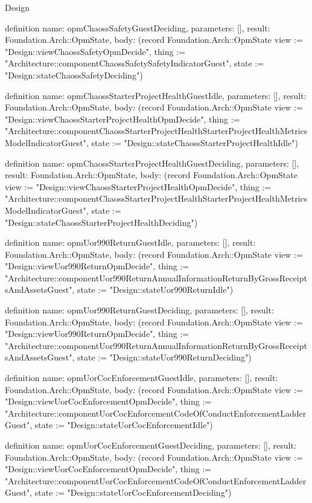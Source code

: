 \begin{lexlean}{Design}
\begin{semanticmodule}
definition{
  name: opmChaossSafetyGuestDeciding,
  parameters: [],
  result: Foundation.Arch::OpmState,
  body: (record Foundation.Arch::OpmState {view := "Design::viewChaossSafetyOpmDecide", thing := "Architecture::componentChaossSafetySafetyIndicatorGuest", state := "Design::stateChaossSafetyDeciding"})
}

definition{
  name: opmChaossStarterProjectHealthGuestIdle,
  parameters: [],
  result: Foundation.Arch::OpmState,
  body: (record Foundation.Arch::OpmState {view := "Design::viewChaossStarterProjectHealthOpmDecide", thing := "Architecture::componentChaossStarterProjectHealthStarterProjectHealthMetricsModelIndicatorGuest", state := "Design::stateChaossStarterProjectHealthIdle"})
}

definition{
  name: opmChaossStarterProjectHealthGuestDeciding,
  parameters: [],
  result: Foundation.Arch::OpmState,
  body: (record Foundation.Arch::OpmState {view := "Design::viewChaossStarterProjectHealthOpmDecide", thing := "Architecture::componentChaossStarterProjectHealthStarterProjectHealthMetricsModelIndicatorGuest", state := "Design::stateChaossStarterProjectHealthDeciding"})
}

definition{
  name: opmUor990ReturnGuestIdle,
  parameters: [],
  result: Foundation.Arch::OpmState,
  body: (record Foundation.Arch::OpmState {view := "Design::viewUor990ReturnOpmDecide", thing := "Architecture::componentUor990ReturnAnnualInformationReturnByGrossReceiptsAndAssetsGuest", state := "Design::stateUor990ReturnIdle"})
}

definition{
  name: opmUor990ReturnGuestDeciding,
  parameters: [],
  result: Foundation.Arch::OpmState,
  body: (record Foundation.Arch::OpmState {view := "Design::viewUor990ReturnOpmDecide", thing := "Architecture::componentUor990ReturnAnnualInformationReturnByGrossReceiptsAndAssetsGuest", state := "Design::stateUor990ReturnDeciding"})
}

definition{
  name: opmUorCocEnforcementGuestIdle,
  parameters: [],
  result: Foundation.Arch::OpmState,
  body: (record Foundation.Arch::OpmState {view := "Design::viewUorCocEnforcementOpmDecide", thing := "Architecture::componentUorCocEnforcementCodeOfConductEnforcementLadderGuest", state := "Design::stateUorCocEnforcementIdle"})
}

definition{
  name: opmUorCocEnforcementGuestDeciding,
  parameters: [],
  result: Foundation.Arch::OpmState,
  body: (record Foundation.Arch::OpmState {view := "Design::viewUorCocEnforcementOpmDecide", thing := "Architecture::componentUorCocEnforcementCodeOfConductEnforcementLadderGuest", state := "Design::stateUorCocEnforcementDeciding"})
}


\end{semanticmodule}
\end{lexlean}
